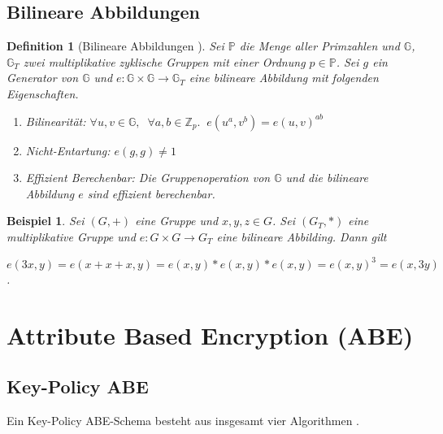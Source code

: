 \documentclass{hsflensburg}
\newtheorem{definition}{Definition}
\newtheorem*{example}{Beispiel}
\begin{document}
	\subsection{Bilineare Abbildungen}
	\begin{definition}[Bilineare Abbildungen \cite{abe}]
		Sei $\mathbb{P}$ die Menge aller Primzahlen und $\mathbb{G}$, $\mathbb{G}_T$
		zwei multiplikative zyklische Gruppen mit einer Ordnung $p \in \mathbb{P}$.
		Sei $g$ ein Generator von $\mathbb{G}$ und $e: \mathbb{G} \times \mathbb{G}
		\to \mathbb{G}_T$ eine bilineare Abbildung mit folgenden Eigenschaften.

		\begin{enumerate}
			\item Bilinearität: $\forall u, v \in \mathbb{G},\;\; \forall a, b \in
				\mathbb{Z}_p. \;\; e(u^a, v^b) = e(u, v)^{ab}$
			\item Nicht-Entartung: $e(g, g) \neq 1$
			\item Effizient Berechenbar: Die Gruppenoperation von $\mathbb{G}$ und die
				bilineare Abbildung $e$ sind effizient berechenbar.
		\end{enumerate}
	\end{definition}

	\begin{example}
		Sei $(G, +)$ eine Gruppe und $x, y, z \in G$. Sei $(G_T, *)$ eine multiplikative
		Gruppe und $e: G \times G \to G_T$ eine bilineare Abbilding. Dann gilt

		$e(3x, y) = e(x+x+x, y) = e(x, y) * e(x, y) * e(x, y) = e(x, y)^3 = e(x,
		3y)$.
	\end{example}

	\section{Attribute Based Encryption (ABE)}
	\subsection{Key-Policy ABE}
	Ein Key-Policy ABE-Schema besteht aus insgesamt vier Algorithmen \cite{kp-abe}.
\end{document}
